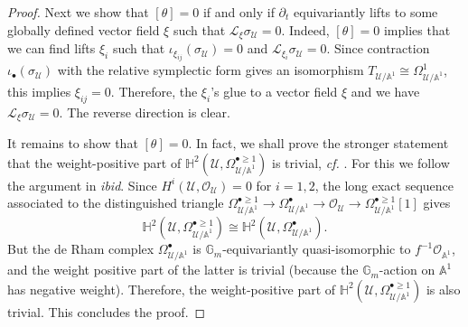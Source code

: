\documentclass[12pt]{amsart}
\theoremstyle{definition}
\newcommand{\bA}{\mathbb{A}}
\newcommand{\bG}{\mathbb{G}}
\newcommand{\cO}{\mathcal{O}}
\newcommand{\cL}{\mathcal{L}}
\newcommand{\scX}{\mathscr{X}}
\numberwithin{equation}{section}
\begin{document}
\begin{proof}
Next we show that $[\theta]=0$ if and only if $\partial_t$ equivariantly lifts to some globally defined vector field $\xi$  such that $\cL_{\xi} \sigma_{\mathscr{U}}=0$. Indeed, $[\theta]=0$ implies that we can find lifts $\xi_i$ such that $\iota_{\xi_{ij}}(\sigma_{\mathscr{U}}) =0$ and $\cL_{\xi_i} \sigma_{\mathscr{U}}=0$. Since contraction $\iota_{\bullet}(\sigma_{\mathscr{U}})$ with the relative symplectic form gives an isomorphism $T_{\mathscr{U}/\bA^1}\cong \Omega^1_{\mathscr{U}/\bA^1}$, this implies $\xi_{ij}=0$. Therefore, the $\xi_i$'s glue to a vector field $\xi$ and we have $\cL_{\xi} \sigma_{\mathscr{U}}=0$. The reverse direction is clear. %

It remains to show that $[\theta]=0$. In fact, we shall prove the stronger statement that the weight-positive part of $\mathbb{H}^2(\mathscr{U},\Omega_{\mathscr{U}/\bA^1}^{\bullet\ge 1})$ is trivial, {\it cf.} \cite[Lemma 21]{Namikawa-deformation-terminal}. For this we follow the argument in {\it ibid}. Since $H^i(\mathscr{U},\cO_{\mathscr{U}})=0$ for $i=1,2$, the long exact sequence associated to the distinguished triangle $\Omega_{\mathscr{U}/\bA^1}^{\bullet\ge 1} \to \Omega_{\mathscr{U}/\bA^1}^{\bullet}\to \cO_{\mathscr{U}} \to \Omega_{\mathscr{U}/\bA^1}^{\bullet\ge 1}[1]$ gives
\[
\mathbb{H}^2(\mathscr{U},\Omega_{\mathscr{U}/\bA^1}^{\bullet\ge 1}) \cong \mathbb{H}^2(\mathscr{U},\Omega_{\mathscr{U}/\bA^1}^{\bullet}).
\]
But the de Rham complex $\Omega_{\mathscr{U}/\bA^1}^{\bullet}$ is $\bG_m$-equivariantly quasi-isomorphic to $f^{-1}\cO_{\bA^1}$, and the weight positive part of the latter is trivial (because the $\bG_m$-action on $\bA^1$ has negative weight). Therefore, the weight-positive part of $\mathbb{H}^2(\mathscr{U},\Omega_{\mathscr{U}/\bA^1}^{\bullet\ge 1})$ is also trivial. This concludes the proof.
\end{proof}

\end{document}
